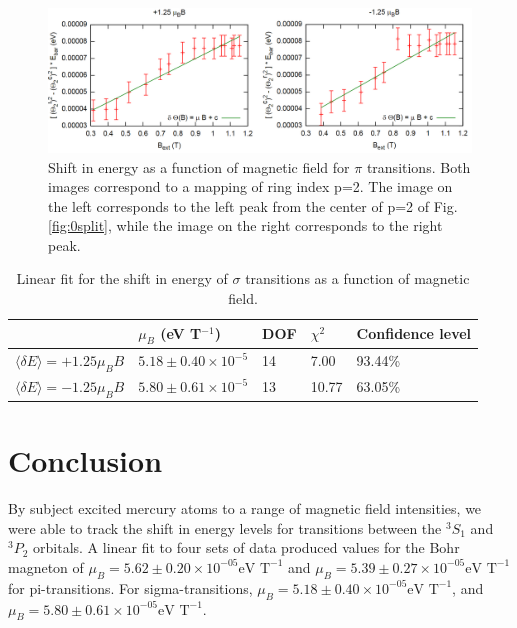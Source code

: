 \documentclass[12pt]{article}
\begin{document}
\begin{figure}[h!]\centering
 \quad \includegraphics[width=01\textwidth]{0}
\caption{Shift in energy as a function of magnetic field for $\pi$ transitions. Both images correspond to a mapping of ring index p=2. The image on the left corresponds to the left peak from the center of p=2 of Fig.\ref{fig:0split}, while the image on the right corresponds to the right peak. }
\label{fig:0}
\end{figure}

\begin{table}[h!]\centering
\begin{tabular}{|p{4cm} |p{3cm}|p{2cm}|p{2.5cm}|p{3.25cm}|}
 \hline
 &  $\mu_B$ (eV T${}^{-1}$)& DOF & $\chi^2$ & Confidence level \\
 \hline
$\langle \delta E\rangle = +1.25\mu_BB$ &  $5.18 \pm 0.40 \times 10^{-5}$ &  14 & 7.00 & 93.44\%\\
 \hline
$\langle \delta E\rangle = -1.25\mu_BB$ & $5.80 \pm 0.61 \times 10^{-5}$ & 13  & 10.77 & 63.05\%\\
 \hline
\end{tabular}
\def\sym#1{\ifmmode^{#1}\else\(^{#1}\)\fi}
\caption{Linear fit for the shift in energy of $\sigma$ transitions as a function of magnetic field.}
\label{tab:m2}
\end{table}



\section{Conclusion}
By subject excited mercury atoms to a range of magnetic field intensities, we were able to track the shift in energy levels for transitions between the ${}^3S_1$ and ${}^3P_2$ orbitals. A linear fit to four sets of data produced values for the Bohr magneton of $\mu_B = 5.62 \pm 0.20 \times 10^{-05} \text{eV T}^{-1}$ and $\mu_B = 5.39 \pm 0.27 \times 10^{-05} \text{eV T}^{-1}$ for pi-transitions. For sigma-transitions, $\mu_B = 5.18 \pm 0.40 \times 10^{-05} \text{eV T}^{-1}$, and $\mu_B = 5.80 \pm 0.61 \times 10^{-05} \text{eV T}^{-1}$.
\\\\\\\\\\\\\\\\\\\\\
\end{document}
